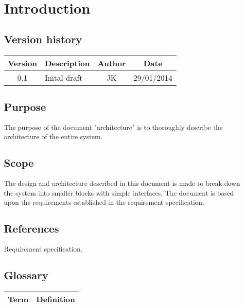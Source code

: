 \chapter{Introduction}
\section{Version history}
\begin{table}[H]
\begin{tabular}{|c|p{9cm}|c|c|}
\hline
Version & Description & Author & Date\\
\hline
0.1 & Inital draft & JK & 29/01/2014\\
\hline
\end{tabular}
\end{table}

\section{Purpose}
The purpose of the document "architecture" is to thoroughly describe the architecture of the entire system.

\section{Scope}
The design and architecture described in this document is made to break down the system into smaller blocks with simple interfaces. The document is based upon the requirements established in the requirement specification.

\section{References}
Requirement specification.

\section{Glossary}
\begin{table}[H]
\centering
\begin{tabular}{|p{4cm}|p{7cm}|}
\hline
Term & Definition\\ \hline
\end{tabular}
\end{table}
